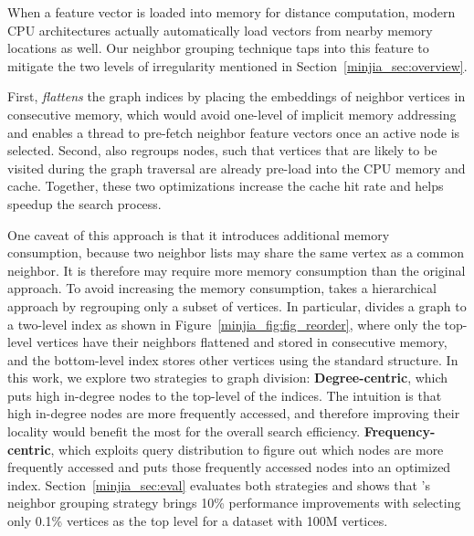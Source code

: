 When a feature vector is loaded into memory for distance computation, modern CPU architectures actually automatically load vectors from nearby memory locations as well. 
Our neighbor grouping technique taps into this feature to mitigate the two levels of irregularity mentioned in Section~\ref{minjia_sec:overview}.

First, \Hammer \emph{flattens} the graph indices by placing the embeddings of neighbor vertices in consecutive memory, which would avoid one-level of implicit memory addressing and enables a thread to pre-fetch neighbor feature vectors once an active node is selected.  Second, \Hammer also regroups nodes, such that vertices that are likely to be visited during the graph traversal are already pre-load into the CPU memory and cache. Together, these two optimizations increase the cache hit rate and helps speedup the search process. 


One caveat of this approach is that it introduces additional memory consumption, because two neighbor lists may share the same vertex as a common neighbor. It is therefore may require more memory consumption than the original approach.
To avoid increasing the memory consumption, \Hammer takes a hierarchical approach by regrouping only a subset of vertices. In particular, \Hammer divides a graph to a two-level index as shown in Figure~\ref{minjia_fig:fig_reorder}, where only the top-level vertices have their neighbors flattened and stored in consecutive memory, and the bottom-level index stores other vertices using the standard structure. 
In this work, we explore two strategies to graph division: 
     \textbf{Degree-centric}, which puts high in-degree nodes to the top-level of the indices. The intuition is that high in-degree nodes are more frequently accessed, and therefore improving their locality would benefit the most for the overall search efficiency.
     \textbf{Frequency-centric}, which exploits query distribution to figure out which nodes are more frequently accessed and puts those frequently accessed nodes into an optimized index.
Section~\ref{minjia_sec:eval} evaluates both strategies and shows that \Hammer's neighbor grouping strategy brings 10\% performance improvements with selecting only 0.1\% vertices as the top level for a dataset with 100M vertices.



